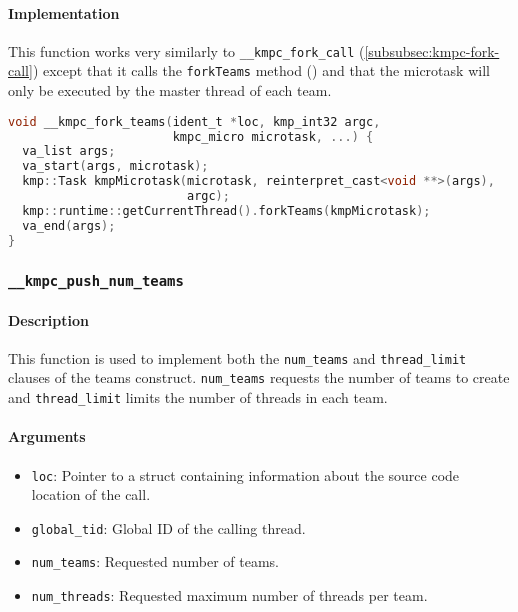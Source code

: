 \paragraph{Implementation} This function works very similarly to \texttt{__kmpc_fork_call}
(\cref{subsubsec:kmpc-fork-call}) except that it calls the \texttt{forkTeams} method ()
and that the microtask will only be executed by the master thread of each team.

\begin{lstlisting}[language=C, caption={__kmpc_fork_teams}, label={lst:kmpc-fork-teams}, escapechar=@]
void __kmpc_fork_teams(ident_t *loc, kmp_int32 argc,
                       kmpc_micro microtask, ...) {
  va_list args;
  va_start(args, microtask);
  kmp::Task kmpMicrotask(microtask, reinterpret_cast<void **>(args),
                         argc);
  kmp::runtime::getCurrentThread().forkTeams(kmpMicrotask);
  va_end(args);
}
\end{lstlisting}

\subsubsection{\texttt{__kmpc_push_num_teams}}
\label{subsubsec:kmpc-push-num-teams}

\paragraph{Description} This function is used to implement both the \texttt{num_teams} and
\texttt{thread_limit} clauses of the teams construct. \texttt{num\_teams} requests the number of
teams to create and \texttt{thread\_limit} limits the number of threads in each team.

\paragraph{Arguments}
\begin{itemize}
	\item \texttt{loc}: Pointer to a struct containing information about the source code location
	      of the call.
	\item \texttt{global\_tid}: Global ID of the calling thread.
	\item \texttt{num\_teams}: Requested number of teams.
	\item \texttt{num\_threads}: Requested maximum number of threads per team.
\end{itemize}

